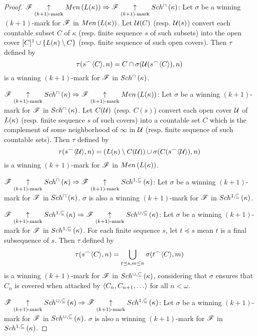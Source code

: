 \documentclass{amsart}
\theoremstyle{definition}
\begin{document}
\begin{proof}
  \(\mathscr{F} \underset{(k+1)\text{-mark}}{\uparrow}Men\left({L(\kappa)}\right)
    \Rightarrow
  \mathscr{F} \underset{(k+1)\text{-mark}}{\uparrow}Sch^{\cap}\left({\kappa}\right)\):
  Let \(\sigma\) be a winning \((k+1)\)-mark for \(\mathscr{F}\) in
  \(Men\left({L(\kappa)}\right)\). Let \(\mathcal{U}(C)\) (resp. \(\mathcal{U}(s)\)) convert each
  countable subset \(C\) of \(\kappa\) (resp. finite sequence \(s\) of such subsets)
  into the open cover \([C]^1\cup\{L(\kappa)\setminus C\}\)
  (resp. finite sequence of such open covers). Then \(\tau\) defined by
    \[
      \tau(s{^\frown}\langle C\rangle,n)
        =
      C\cap\sigma(\mathcal{U}(s{^\frown}\langle C\rangle),n)
    \]
  is a winning \((k+1)\)-mark for \(\mathscr{F}\) in \(Sch^{\cap}\left({\kappa}\right)\).

  \(\mathscr{F} \underset{(k+1)\text{-mark}}{\uparrow}Sch^{\cap}\left({\kappa}\right)
    \Rightarrow
  \mathscr{F} \underset{(k+1)\text{-mark}}{\uparrow}Men\left({L(\kappa)}\right)\):
  Let \(\sigma\) be a winning \((k+1)\)-mark for \(\mathscr{F}\) in
  \(Sch^{\cap}\left({\kappa}\right)\). Let \(C(\mathcal{U})\) (resp. \(C(s)\)) convert each open
  cover \(\mathcal{U}\) of \(L(\kappa)\) (resp. finite sequence \(s\) of such covers)
  into a countable set \(C\) which is the complement of some neighborhood of
  \(\infty\) in \(\mathcal{U}\) (resp. finite sequence of such countable sets).
  Then \(\tau\) defined by
    \[
      \tau(s{^\frown}\langle\mathcal{U}\rangle,n)
        =
      (L(\kappa)\setminus C(\mathcal{U}))
        \cup
      \sigma(C(s{^\frown}\langle\mathcal{U}\rangle),n)
    \]
  is a winning \((k+1)\)-mark for \(\mathscr{F}\) in \(Men\left({L(\kappa)}\right)\).

  \(\mathscr{F} \underset{(k+1)\text{-mark}}{\uparrow}Sch^{\cap}\left({\kappa}\right)
    \Rightarrow
  \mathscr{F} \underset{(k+1)\text{-mark}}{\uparrow}Sch^{1,\subseteq}\left({\kappa}\right)\):
  Let \(\sigma\) be a winning \((k+1)\)-mark for \(\mathscr{F}\) in
  \(Sch^{\cap}\left({\kappa}\right)\). \(\sigma\) is also a winning \((k+1)\)-mark for \(\mathscr{F}\)
  in \(Sch^{1,\subseteq}\left({\kappa}\right)\).

  \(\mathscr{F} \underset{(k+1)\text{-mark}}{\uparrow}Sch^{1,\subseteq}\left({\kappa}\right)
    \Rightarrow
  \mathscr{F} \underset{(k+1)\text{-mark}}{\uparrow}Sch^{\cup,\subseteq}\left({\kappa}\right)\): Let \(\sigma\) be a winning
  \((k+1)\)-mark for \(\mathscr{F}\) in
  \(Sch^{1,\subseteq}\left({\kappa}\right)\). For each finite sequence \(s\), let
  \(t\preceq s\) mean \(t\)
  is a final subsequence of \(s\). Then \(\tau\) defined by
    \[
      \tau(s{^\frown}\langle C\rangle,n)
        =
      \bigcup_{t\preceq s, m\leq n}
      \sigma(t{^\frown}\langle C\rangle,m)
    \]
  is a winning \((k+1)\)-mark for \(\mathscr{F}\) in \(Sch^{\cup,\subseteq}\left({\kappa}\right)\),
  considering that \(\sigma\) ensures that \(C_n\) is covered when
  attacked by \(\<C_n,C_{n+1},\dots\>\) for all \(n<\omega\).

  \(\mathscr{F} \underset{(k+1)\text{-mark}}{\uparrow}Sch^{\cup,\subseteq}\left({\kappa}\right)
    \Rightarrow
  \mathscr{F} \underset{(k+1)\text{-mark}}{\uparrow}Sch^{1,\subseteq}\left({\kappa}\right)\):
  Let \(\sigma\) be a winning \((k+1)\)-mark for \(\mathscr{F}\) in
  \(Sch^{\cup,\subseteq}\left({\kappa}\right)\). \(\sigma\) is also a winning
  \((k+1)\)-mark for \(\mathscr{F}\)
  in \(Sch^{1,\subseteq}\left({\kappa}\right)\).


\end{proof}
\end{document}
